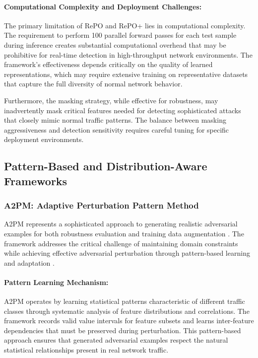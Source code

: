 \paragraph{Computational Complexity and Deployment Challenges:}
The primary limitation of RePO and RePO+ lies in computational complexity. The requirement to perform 100 parallel forward passes for each test sample during inference creates substantial computational overhead that may be prohibitive for real-time detection in high-throughput network environments. The framework's effectiveness depends critically on the quality of learned representations, which may require extensive training on representative datasets that capture the full diversity of normal network behavior.

Furthermore, the masking strategy, while effective for robustness, may inadvertently mask critical features needed for detecting sophisticated attacks that closely mimic normal traffic patterns. The balance between masking aggressiveness and detection sensitivity requires careful tuning for specific deployment environments.

\subsection{Pattern-Based and Distribution-Aware Frameworks}

\subsubsection{A2PM: Adaptive Perturbation Pattern Method}

A2PM represents a sophisticated approach to generating realistic adversarial examples for both robustness evaluation and training data augmentation \cite{merzouk2022investigating}. The framework addresses the critical challenge of maintaining domain constraints while achieving effective adversarial perturbation through pattern-based learning and adaptation \cite{merzouk2022investigating}.

\paragraph{Pattern Learning Mechanism:}
A2PM operates by learning statistical patterns characteristic of different traffic classes through systematic analysis of feature distributions and correlations. The framework records valid value intervals for feature subsets and learns inter-feature dependencies that must be preserved during perturbation. This pattern-based approach ensures that generated adversarial examples respect the natural statistical relationships present in real network traffic.

